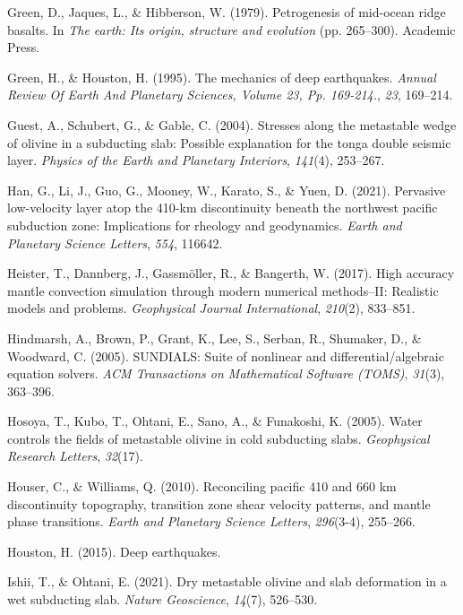 \documentclass[draft,linenumbers]{agujournal2019}
\newlength{\cslhangindent}
\newenvironment{CSLReferences}[2]
 {\begin{list}{}{
  \setlength{\itemindent}{0pt}
  \setlength{\leftmargin}{0pt}
  \setlength{\parsep}{0pt}
  \ifodd #1
   \setlength{\leftmargin}{\cslhangindent}
   \setlength{\itemindent}{-\cslhangindent}
  \fi
  \setlength{\itemsep}{#2\baselineskip}
  }
  \item\relax}
 {\end{list}}
\begin{document}
\begin{CSLReferences}{1}{0}
Green, D., Jaques, L., \& Hibberson, W. (1979). Petrogenesis of
mid-ocean ridge basalts. In \emph{The earth: Its origin, structure and
evolution} (pp. 265--300). Academic Press.

Green, H., \& Houston, H. (1995). The mechanics of deep earthquakes.
\emph{Annual Review Of Earth And Planetary Sciences, Volume 23, Pp.
169-214.}, \emph{23}, 169--214.

Guest, A., Schubert, G., \& Gable, C. (2004). Stresses along the
metastable wedge of olivine in a subducting slab: Possible explanation
for the tonga double seismic layer. \emph{Physics of the Earth and
Planetary Interiors}, \emph{141}(4), 253--267.

Han, G., Li, J., Guo, G., Mooney, W., Karato, S., \& Yuen, D. (2021).
Pervasive low-velocity layer atop the 410-km discontinuity beneath the
northwest pacific subduction zone: Implications for rheology and
geodynamics. \emph{Earth and Planetary Science Letters}, \emph{554},
116642.

Heister, T., Dannberg, J., Gassmöller, R., \& Bangerth, W. (2017). High
accuracy mantle convection simulation through modern numerical
methods--II: Realistic models and problems. \emph{Geophysical Journal
International}, \emph{210}(2), 833--851.

Hindmarsh, A., Brown, P., Grant, K., Lee, S., Serban, R., Shumaker, D.,
\& Woodward, C. (2005). SUNDIALS: Suite of nonlinear and
differential/algebraic equation solvers. \emph{ACM Transactions on
Mathematical Software (TOMS)}, \emph{31}(3), 363--396.

Hosoya, T., Kubo, T., Ohtani, E., Sano, A., \& Funakoshi, K. (2005).
Water controls the fields of metastable olivine in cold subducting
slabs. \emph{Geophysical Research Letters}, \emph{32}(17).

Houser, C., \& Williams, Q. (2010). Reconciling pacific 410 and 660 km
discontinuity topography, transition zone shear velocity patterns, and
mantle phase transitions. \emph{Earth and Planetary Science Letters},
\emph{296}(3-4), 255--266.

Houston, H. (2015). Deep earthquakes.

Ishii, T., \& Ohtani, E. (2021). Dry metastable olivine and slab
deformation in a wet subducting slab. \emph{Nature Geoscience},
\emph{14}(7), 526--530.


\end{CSLReferences}
\end{document}
